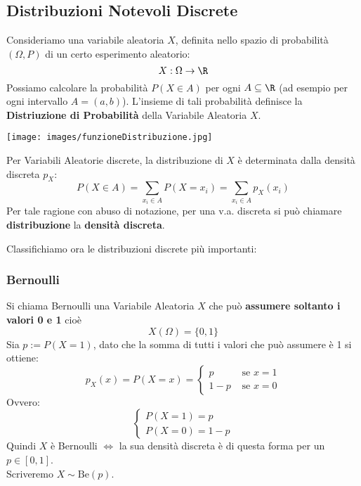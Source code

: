 

	\subsection{Distribuzioni Notevoli Discrete}
	Consideriamo una variabile aleatoria $X$, definita nello spazio di probabilità
$(\Omega, P)$ di un certo esperimento aleatorio:
	\[
		X:\Omega \rightarrow \R
	\]
	Possiamo calcolare la probabilità $P(X \in A)$ per ogni $A \subseteq \R$
	(ad esempio per ogni intervallo $A=(a,b)$).
	L'insieme di tali probabilità definisce la \textbf{Distriuzione di Probabilità} della Variabile Aleatoria $X$.
	\begin{center}
		\texttt{[image: images/funzioneDistribuzione.jpg]}
	\end{center}

	Per Variabili Aleatorie discrete, la distribuzione di $X$ è determinata dalla densità discreta $p_X$:
	\[
		P(X \in A) = \sum_{x_i \in A} P(X=x_i) = \sum_{x_i \in A} p_X(x_i)
	\]
	Per tale ragione con abuso di notazione, per una v.a. discreta si può chiamare
	\textbf{distribuzione} la \textbf{densità discreta}.

	Classifichiamo ora le distribuzioni discrete più importanti:

	\subsubsection{Bernoulli}
	Si chiama Bernoulli una Variabile Aleatoria $X$ che può \textbf{assumere soltanto i valori 0 e 1} cioè
	\[
		X(\Omega) = \{0,1\}
	\]
	Sia $p:=P(X=1)$, dato che la somma di tutti i valori che può assumere è 1 si ottiene:
	\[
		p_X (x) = P(X=x) =
		\begin{cases}
			p   & \text{ se } x=1 \\
			1-p & \text{ se } x=0
		\end{cases}
	\]
	Ovvero:
	\[
		\begin{cases}
			P(X=1) = p \\
			P(X=0)= 1-p
		\end{cases}
	\]
	Quindi $X$ è Bernoulli $\Leftrightarrow$ la sua densità discreta è di questa
	forma per un $p \in [0,1]$.
	\\ Scriveremo $X \sim \text{Be}(p)$.

